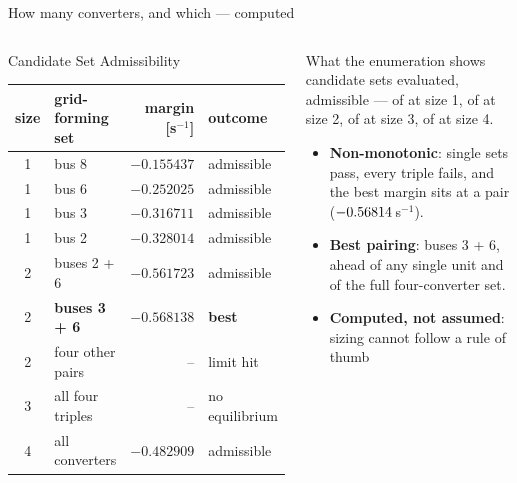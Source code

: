 \documentclass[aspectratio=169,10pt]{beamer}
\begin{document}
\begin{frame}[shrink=4]{How many converters, and which --- computed}
\begin{columns}[T,onlytextwidth]
\begin{block}{Candidate Set Admissibility}
\vspace{-0.3em}\begin{center}\footnotesize
\begin{tabular}{clrl}\toprule
size & grid-forming set & margin [s$^{-1}$] & outcome \\ \midrule
1 & bus 8 & $-0.155437$ & admissible \\
1 & bus 6 & $-0.252025$ & admissible \\
1 & bus 3 & $-0.316711$ & admissible \\
1 & bus 2 & $-0.328014$ & admissible \\
2 & buses 2 + 6 & $-0.561723$ & admissible \\
2 & \textbf{buses 3 + 6} & $\mathbf{-0.568138}$ & \textbf{best} \\
2 & four other pairs & -- & limit hit \\
3 & all four triples & -- & no equilibrium \\
4 & all converters & $-0.482909$ & admissible \\
\bottomrule\end{tabular}
\end{center}\vspace{-0.3em}
\end{block}
\begin{block}{What the enumeration shows}
\footnotesize
\CandTotal{} candidate sets evaluated, \CandReady{} admissible ---
\CandReadyNOne{} of \CandTotalNOne{} at size 1,
\CandReadyNTwo{} of \CandTotalNTwo{} at size 2,
\CandReadyNThree{} of \CandTotalNThree{} at size 3,
\CandReadyNFour{} of \CandTotalNFour{} at size 4.
\begin{itemize}\footnotesize
  \item \textbf{Non-monotonic}: single sets pass, every triple fails, and the
        best margin sits at a pair ($-0.56814$\,s$^{-1}$).
  \item \textbf{Best pairing}: buses 3 + 6, ahead of any single unit and of
        the full four-converter set.
  \item \textbf{Computed, not assumed}: sizing cannot follow a rule of thumb

\end{itemize}
\end{block}
\end{columns}
\end{frame}
\end{document}
